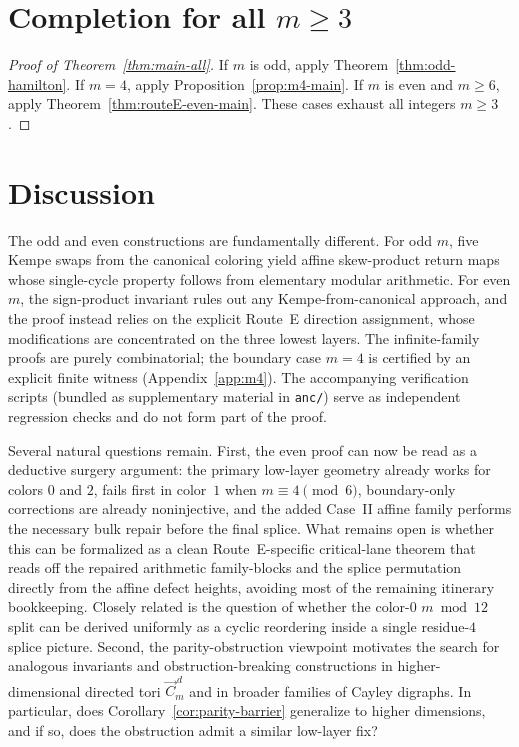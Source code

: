 \documentclass[11pt]{article}
\begin{document}
\section{Completion for all $m\ge 3$}\label{sec:completion}

\begin{proof}[Proof of Theorem~\ref{thm:main-all}]
If $m$ is odd, apply Theorem~\ref{thm:odd-hamilton}.
If $m=4$, apply Proposition~\ref{prop:m4-main}.
If $m$ is even and $m\ge 6$, apply Theorem~\ref{thm:routeE-even-main}.
These cases exhaust all integers $m\ge 3$.
\end{proof}

\section{Discussion}\label{sec:discussion}

The odd and even constructions are fundamentally different.
For odd $m$, five Kempe swaps from the canonical coloring yield affine skew-product return maps whose single-cycle property follows from elementary modular arithmetic.
For even $m$, the sign-product invariant rules out any Kempe-from-canonical approach, and the proof instead relies on the explicit Route~E direction assignment, whose modifications are concentrated on the three lowest layers.
The infinite-family proofs are purely combinatorial; the boundary case $m=4$ is certified by an explicit finite witness (Appendix~\ref{app:m4}).
The accompanying verification scripts (bundled as supplementary material in \texttt{anc/}) serve as independent regression checks and do not form part of the proof.

Several natural questions remain.
First, the even proof can now be read as a deductive surgery argument: the primary low-layer geometry already works for colors $0$ and $2$, fails first in color~$1$ when $m\equiv 4\pmod 6$, boundary-only corrections are already noninjective, and the added Case~II affine family performs the necessary bulk repair before the final splice.
What remains open is whether this can be formalized as a clean Route~E-specific critical-lane theorem that reads off the repaired arithmetic family-blocks and the splice permutation directly from the affine defect heights, avoiding most of the remaining itinerary bookkeeping.
Closely related is the question of whether the color-$0$ $m\bmod 12$ split can be derived uniformly as a cyclic reordering inside a single residue-$4$ splice picture.
Second, the parity-obstruction viewpoint motivates the search for analogous invariants and obstruction-breaking constructions in higher-dimensional directed tori $\vec C_m^{\,d}$ and in broader families of Cayley digraphs.
In particular, does Corollary~\ref{cor:parity-barrier} generalize to higher dimensions, and if so, does the obstruction admit a similar low-layer fix?
\end{document}
